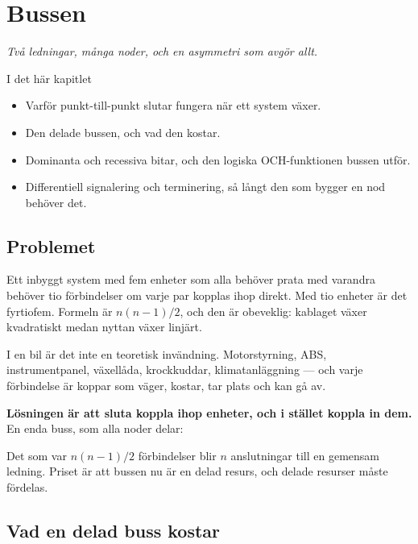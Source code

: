 \chapter{Bussen}
\label{ch:buss}

{\large\itshape Två ledningar, många noder, och en asymmetri som avgör allt.\par}

\begin{chapterbox}{I det här kapitlet}
\begin{itemize}
  \item Varför punkt-till-punkt slutar fungera när ett system växer.
  \item Den delade bussen, och vad den kostar.
  \item Dominanta och recessiva bitar, och den logiska OCH-funktionen bussen utför.
  \item Differentiell signalering och terminering, så långt den som bygger en nod behöver det.
\end{itemize}
\end{chapterbox}

\section{Problemet}

Ett inbyggt system med fem enheter som alla behöver prata med varandra behöver tio förbindelser
om varje par kopplas ihop direkt. Med tio enheter är det fyrtiofem. Formeln är $n(n-1)/2$, och
den är obeveklig: kablaget växer kvadratiskt medan nyttan växer linjärt.

I en bil är det inte en teoretisk invändning. Motorstyrning, ABS, instrumentpanel, växellåda,
krockkuddar, klimatanläggning --- och varje förbindelse är koppar som väger, kostar, tar plats och
kan gå av.

\textbf{Lösningen är att sluta koppla ihop enheter, och i stället koppla in dem.} En enda buss,
som alla noder delar:


Det som var $n(n-1)/2$ förbindelser blir $n$ anslutningar till en gemensam ledning. Priset är
att bussen nu är en delad resurs, och delade resurser måste fördelas.

\section{Vad en delad buss kostar}

